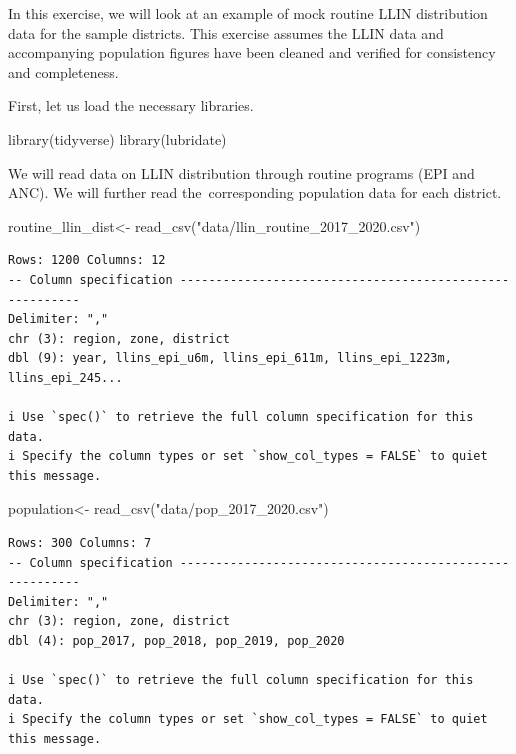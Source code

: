 \documentclass[
  letterpaper,
  DIV=11,
  numbers=noendperiod]{scrreprt}
\newenvironment{Shaded}{\begin{snugshade}}{\end{snugshade}}
\newcommand{\FunctionTok}[1]{\textcolor[rgb]{0.28,0.35,0.67}{#1}}
\newcommand{\NormalTok}[1]{\textcolor[rgb]{0.00,0.23,0.31}{#1}}
\newcommand{\OtherTok}[1]{\textcolor[rgb]{0.00,0.23,0.31}{#1}}
\newcommand{\StringTok}[1]{\textcolor[rgb]{0.13,0.47,0.30}{#1}}
\begin{document}
In this exercise, we will look at an example of mock routine LLIN
distribution data for the sample districts. This exercise assumes the
LLIN data and accompanying population figures have been cleaned and
verified for consistency and completeness.

First, let us load the necessary libraries.~~~

\begin{Shaded}
\begin{Highlighting}[]
\FunctionTok{library}\NormalTok{(tidyverse)}
\FunctionTok{library}\NormalTok{(lubridate)}
\end{Highlighting}
\end{Shaded}

We will read data on LLIN distribution through routine programs (EPI and
ANC). We will further read the~corresponding population data for each
district.

\begin{Shaded}
\begin{Highlighting}[]
\NormalTok{routine\_llin\_dist}\OtherTok{\textless{}{-}} \FunctionTok{read\_csv}\NormalTok{(}\StringTok{"data/llin\_routine\_2017\_2020.csv"}\NormalTok{) }
\end{Highlighting}
\end{Shaded}

\begin{verbatim}
Rows: 1200 Columns: 12
-- Column specification --------------------------------------------------------
Delimiter: ","
chr (3): region, zone, district
dbl (9): year, llins_epi_u6m, llins_epi_611m, llins_epi_1223m, llins_epi_245...

i Use `spec()` to retrieve the full column specification for this data.
i Specify the column types or set `show_col_types = FALSE` to quiet this message.
\end{verbatim}

\begin{Shaded}
\begin{Highlighting}[]
\NormalTok{population}\OtherTok{\textless{}{-}} \FunctionTok{read\_csv}\NormalTok{(}\StringTok{"data/pop\_2017\_2020.csv"}\NormalTok{)}
\end{Highlighting}
\end{Shaded}

\begin{verbatim}
Rows: 300 Columns: 7
-- Column specification --------------------------------------------------------
Delimiter: ","
chr (3): region, zone, district
dbl (4): pop_2017, pop_2018, pop_2019, pop_2020

i Use `spec()` to retrieve the full column specification for this data.
i Specify the column types or set `show_col_types = FALSE` to quiet this message.
\end{verbatim}
\end{document}
